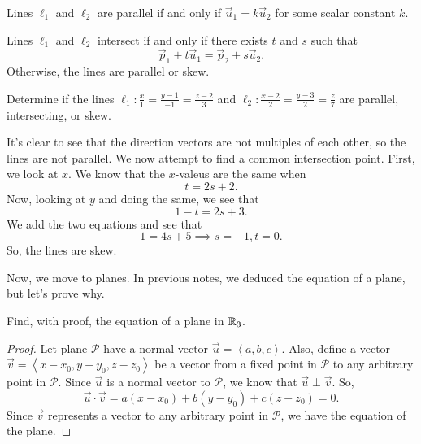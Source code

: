 \documentclass[11pt]{scrartcl}
\begin{document}
\begin{theorem}
    Lines $\ell_{1}$ and $\ell_{2}$ are parallel if and only if $\vec{u}_{1} = k\vec{u}_{2}$ for some scalar constant $k$.
\end{theorem}

\begin{theorem}
    Lines $\ell_{1}$ and $\ell_{2}$ intersect if and only if there exists $t$ and $s$ such that
    \[\vec{p}_{1} + t\vec{u}_{1} = \vec{p}_{2} + s\vec{u}_{2}.\]
    Otherwise, the lines are parallel or skew.
\end{theorem}

\begin{example}
    Determine if the lines $\ell_{1} : \frac{x}{1} = \frac{y - 1}{-1} = \frac{z - 2}{3}$ and $\ell_{2} : \frac{x - 2}{2} = \frac{y -  3}{2} = \frac{z}{7}$ are parallel, intersecting, or skew.

    \begin{soln}
        It's clear to see that the direction vectors are not multiples of each other, so the lines are not parallel. We now attempt to find a common intersection point. First, we look at $x$. We know that the $x$-valeus are the same when
        \[t = 2s + 2.\]
        Now, looking at $y$ and doing the same, we see that
        \[1 - t = 2s + 3.\]
        We add the two equations and see that
        \[1 = 4s + 5 \implies s = -1, t = 0.\]
        So, the lines are skew.
    \end{soln}
\end{example}

Now, we move to planes. In previous notes, we deduced the equation of a plane, but let's prove why.

\begin{example}
    Find, with proof, the equation of a plane in $\mathbb R_{3}$.

    \begin{proof}
        Let plane $\mathcal{P}$ have a normal vector $\vec{u} = \left<a, b, c\right>$. Also, define a vector $\vec{v} = \left<x - x_{0}, y - y_{0}, z - z_{0}\right>$ be a vector from a fixed point in $\mathcal{P}$ to any arbitrary point in $\mathcal{P}$. Since $\vec{u}$ is a normal vector to $\mathcal{P}$, we know that $\vec{u} \perp \vec{v}$. So,
        \[\vec{u} \cdot \vec{v} = a(x - x_{0}) + b(y - y_{0}) + c(z - z_{0}) = 0.\]
        Since $\vec{v}$ represents a vector to any arbitrary point in $\mathcal{P}$, we have the equation of the plane.
    \end{proof}
\end{example}
\end{document}
